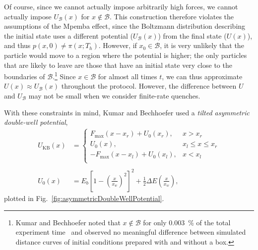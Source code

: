 \documentclass[hyperref={colorlinks=true, urlcolor=blue, citecolor=blue, final, bound}]{sfuthesis}
\begin{document}
\begin{enumerate}
    Of course, since we cannot actually impose arbitrarily high forces, we cannot actually impose $U_{\mathcal B}(x)$ for $x\notin\mathcal B$. This construction therefore violates the assumptions of the Mpemba effect, since the Boltzmann distribution describing the initial state uses a different potential ($U_{\mathcal B}(x)$) from the final state ($U(x)$), and thus $p(x,0)\neq \pi(x;T_h)$. However, if $x_0\in\mathcal B$, it is very unlikely that the particle would move to a region where the potential is higher; the only particles that are likely to leave are those that have an initial state very close to the boundaries of $\mathcal B$.\footnote{Kumar and Bechhoefer noted that $x\notin\mathcal B$ for only \qty{0.003}{\percent} of the total experiment time~\cite{Kumar2020} and observed no meaningful difference between simulated distance curves of initial conditions prepared with and without a box.} Since $x\in\mathcal B$ for almost all times $t$, we can thus approximate $U(x)\approx U_{\mathcal B}(x)$ throughout the protocol. However, the difference between $U$ and $U_{\mathcal B}$ may not be small when we consider finite-rate quenches. 
\end{enumerate}

With these constraints in mind, Kumar and Bechhoefer used a \textit{tilted asymmetric double-well potential},
\begin{align}
    U_{\mathrm{KB}}(x) &= \begin{cases}
        F_{\max}(x-x_r)+U_0(x_r),& x > x_r\\
        U_0(x),& x_l \leq x \leq x_r\\
        -F_{\max}(x-x_l)+U_0(x_l),& x < x_l\\
    \end{cases}\\
    \nonumber\\
    U_0(x) &= E_b\left[ 1-\left( \frac{x}{x_w} \right)^2 \right]^2 + \frac 12 \Delta E\left( \frac{x}{x_w} \right),\label{eq:asymmetricDoubleWellPotential}
\end{align}
plotted in Fig.~\ref{fig:asymmetricDoubleWellPotential}.
\end{document}
